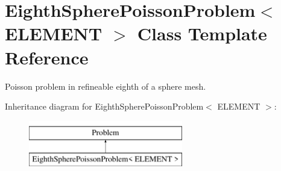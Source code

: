 \hypertarget{classEighthSpherePoissonProblem}{}\section{Eighth\+Sphere\+Poisson\+Problem$<$ E\+L\+E\+M\+E\+NT $>$ Class Template Reference}
\label{classEighthSpherePoissonProblem}


Poisson problem in refineable eighth of a sphere mesh.  


Inheritance diagram for Eighth\+Sphere\+Poisson\+Problem$<$ E\+L\+E\+M\+E\+NT $>$\+:\begin{figure}[H]
\begin{center}
\leavevmode
\includegraphics[height=2.000000cm]{classEighthSpherePoissonProblem}
\end{center}
\end{figure}
